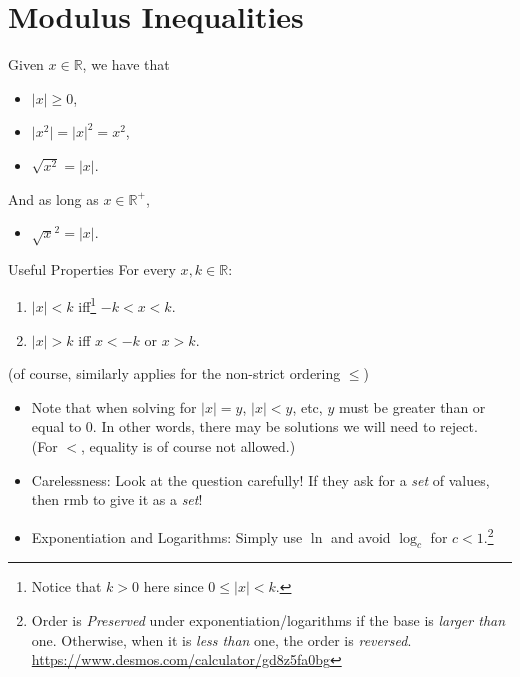 \documentclass[oneside]{book}
\begin{document}
\section{Modulus Inequalities}
\begin{fact}
    Given \(x \in \mathbb{R}\), we have that 
    \begin{itemize}
        \item \(\lvert x \rvert \geq 0\),
        \item \(\lvert x^2 \rvert=\lvert x \rvert^2=x^2\),
        \item \(\sqrt{x^2}=\lvert x \rvert\).
    \end{itemize}
    And as long as \(x \in \mathbb{R}^+\),
    \begin{itemize}
        \item \(\sqrt{x}^2=\lvert x \rvert\).
    \end{itemize}
\end{fact}
\begin{stbox}{Useful Properties}
  For every \(x,k \in \mathbb{R}\):
  \begin{enumerate}[label=(\alph*)]
      \item \(\lvert x \rvert < k\) iff\footnote{Notice that \(k>0\) here since \(0 \leq \lvert x \rvert < k\).} \(-k<x<k\).
      \item \(\lvert x \rvert > k\) iff \(x<-k\) or \(x>k\).
  \end{enumerate}
  \footnotesize (of course, similarly applies for the non-strict ordering \(\leq\)) \normalsize
\end{stbox}
\begin{IN}
    \begin{itemize}[label=\(\circ\)]
        \item Note that when solving for \(\lvert x \rvert=y\), \(\lvert x \rvert < y\), etc, \(y\) must be greater than or equal to 0. In other words, there may be solutions we will need to reject.\\ \footnotesize(For \(<\), equality is of course not allowed.)\normalsize  
    \end{itemize}
\end{IN}
\begin{IN}
\begin{itemize}[label=\scriptsize\(\triangle\)\normalsize]
  \item Carelessness: Look at the question carefully! If they ask for a \emph{set} of values, then rmb to give it as a \emph{set}!
  \item Exponentiation and Logarithms: Simply use \(\ln\) and avoid \(\log_c\) for \(c<1\).\footnote{Order is \emph{Preserved} under exponentiation/logarithms if the base is \emph{larger than} one. Otherwise, when it is \emph{less than} one, the order is \emph{reversed}. \url{https://www.desmos.com/calculator/gd8z5fa0bg}}
\end{itemize}
\end{IN}
\end{document}
